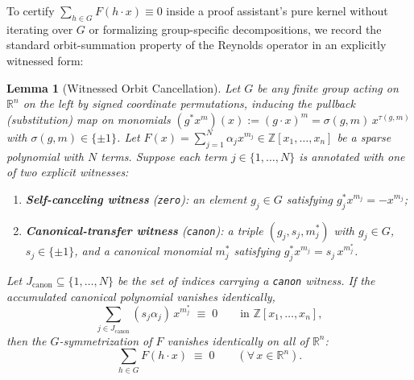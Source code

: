 \documentclass[11pt,a4paper]{article}
\theoremstyle{plain}
\newtheorem{lemma}[theorem]{Lemma}
\theoremstyle{definition}
\theoremstyle{remark}
\newcommand{\R}{\mathbb{R}}
\newcommand{\Z}{\mathbb{Z}}
\newcommand{\code}[1]{\texttt{\small #1}}
\begin{document}
To certify $\sum_{h\in G} F(h\cdot x) \equiv 0$ inside a proof assistant's pure kernel without iterating over $G$ or formalizing group-specific decompositions, we record the standard orbit-summation property of the Reynolds operator in an explicitly witnessed form:

\begin{lemma}[Witnessed Orbit Cancellation]
\label{lem:orbit-cancel}
Let $G$ be any finite group acting on $\R^n$ on the left by signed coordinate permutations, inducing the pullback (substitution) map on monomials $(g^* x^m)(x) := (g\cdot x)^m = \sigma(g, m)\, x^{\tau(g,m)}$ with $\sigma(g,m) \in \{\pm 1\}$. Let $F(x) = \sum_{j=1}^N \alpha_j x^{m_j} \in \Z[x_1,\dots,x_n]$ be a sparse polynomial with $N$ terms. Suppose each term $j \in \{1,\dots,N\}$ is annotated with one of two explicit witnesses:
\begin{enumerate}[label=\textup{(\alph*)}, leftmargin=2em]
  \item \textbf{Self-canceling witness} \textup{(\code{zero})}: an element $g_j \in G$ satisfying $g_j^* x^{m_j} = -x^{m_j}$;
  \item \textbf{Canonical-transfer witness} \textup{(\code{canon})}: a triple $(g_j, s_j, m_j^*)$ with $g_j \in G$, $s_j \in \{\pm 1\}$, and a canonical monomial $m_j^*$ satisfying $g_j^* x^{m_j} = s_j\, x^{m_j^*}$.
\end{enumerate}
Let $J_{\mathrm{canon}} \subseteq \{1,\dots,N\}$ be the set of indices carrying a \code{canon} witness. If the accumulated canonical polynomial vanishes identically,
\begin{equation}
  \label{eq:canon-cancel}
  \sum_{j \in J_{\mathrm{canon}}} (s_j \alpha_j)\, x^{m_j^*} \;\equiv\; 0 \qquad \text{in } \Z[x_1,\dots,x_n],
\end{equation}
then the $G$-symmetrization of $F$ vanishes identically on all of $\R^n$:
\begin{equation}
  \label{eq:orbit-cancel-conc}
  \sum_{h \in G} F(h \cdot x) \;\equiv\; 0 \qquad (\forall\, x \in \R^n).
\end{equation}
\end{lemma}
\end{document}
